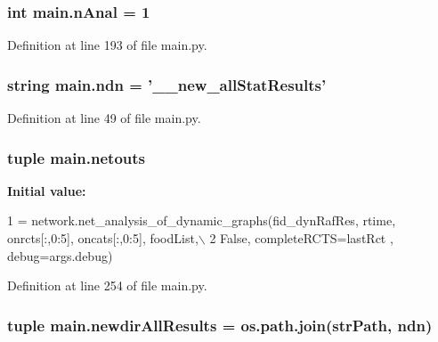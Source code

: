 \hypertarget{a00151_ae7ca1c378927da05feb71e5a9f775afb}{
\subsubsection[{n\-Anal}]{\setlength{\rightskip}{0pt plus 5cm}int main.\-n\-Anal = 1}}\label{a00151_ae7ca1c378927da05feb71e5a9f775afb}


Definition at line 193 of file main.\-py.

\hypertarget{a00151_acaa3f6fffb18a543c7c04d985e77fa6f}{
\subsubsection[{ndn}]{\setlength{\rightskip}{0pt plus 5cm}string main.\-ndn = '\-\_\-\_\-new\-\_\-all\-Stat\-Results'}}\label{a00151_acaa3f6fffb18a543c7c04d985e77fa6f}


Definition at line 49 of file main.\-py.

\hypertarget{a00151_a02c2194d4e56d3d8c6d2c204a8017e3a}{
\subsubsection[{netouts}]{\setlength{\rightskip}{0pt plus 5cm}tuple main.\-netouts}}\label{a00151_a02c2194d4e56d3d8c6d2c204a8017e3a}
{\bfseries Initial value\-:}
\begin{DoxyCode}
1 = network.net\_analysis\_of\_dynamic\_graphs(fid\_dynRafRes, rtime, onrcts[:,0:5], oncats[:,0:5], foodList,\(\backslash\)
2                                                                                                                                                                 
         \textcolor{keyword}{False}, completeRCTS=lastRct , debug=args.debug)
\end{DoxyCode}


Definition at line 254 of file main.\-py.

\hypertarget{a00151_af73b43f5468097ae9443adeb6010a75c}{
\subsubsection[{newdir\-All\-Results}]{\setlength{\rightskip}{0pt plus 5cm}tuple main.\-newdir\-All\-Results = os.\-path.\-join({\bf str\-Path}, {\bf ndn})}}\label{a00151_af73b43f5468097ae9443adeb6010a75c}


